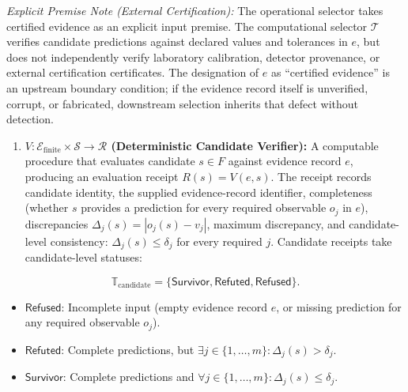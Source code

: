 \documentclass[
  10pt,
]{article}
\providecommand{\tightlist}{%
  \setlength{\itemsep}{0pt}\setlength{\parskip}{0pt}}
\providecommand{\tightlist}{%
  \setlength{\itemsep}{0pt}\setlength{\parskip}{0pt}}
\begin{document}
\emph{Explicit Premise Note (External Certification):} The operational selector takes certified evidence as an explicit input premise. The computational selector \hypertarget{math-E0142-0188}{}{\(\mathcal{T}\)} verifies candidate predictions against declared values and tolerances in \hypertarget{math-E0006-0189}{}{\(e\)}, but does not independently verify laboratory calibration, detector provenance, or external certification certificates. The designation of \hypertarget{math-E0006-0190}{}{\(e\)} as ``certified evidence'' is an upstream boundary condition; if the evidence record itself is unverified, corrupt, or fabricated, downstream selection inherits that defect without detection.

\begin{enumerate}
\def\labelenumi{\arabic{enumi}.}
\setcounter{enumi}{2}
\tightlist
\item
  \textbf{\hypertarget{math-E0143-0191}{}{\(V: \mathcal{E}_{\text{finite}} \times \mathcal{S} \to \mathcal{R}\)} (Deterministic Candidate Verifier):} A computable procedure that evaluates candidate \hypertarget{math-E0144-0192}{}{\(s \in F\)} against evidence record \hypertarget{math-E0006-0193}{}{\(e\)}, producing an evaluation receipt \hypertarget{math-E0145-0194}{}{\(R(s) = V(e, s)\)}. The receipt records candidate identity, the supplied evidence-record identifier, completeness (whether \hypertarget{math-E0146-0195}{}{\(s\)} provides a prediction for every required observable \hypertarget{math-E0139-0196}{}{\(o_j\)} in \hypertarget{math-E0006-0197}{}{\(e\)}), discrepancies \hypertarget{math-E0147-0198}{}{\(\Delta_j(s) = |o_j(s) - v_j|\)}, maximum discrepancy, and candidate-level consistency: \hypertarget{math-E0148-0199}{}{\(\Delta_j(s) \le \delta_j\)} for every required \hypertarget{math-E0149-0200}{}{\(j\)}. Candidate receipts take candidate-level statuses:
\end{enumerate}

\hypertarget{math-E0150-0201}{}{\[\mathbb{T}_{\text{candidate}} = \{\mathsf{Survivor}, \mathsf{Refuted}, \mathsf{Refused}\}.\]}

\begin{itemize}
\item
  \hypertarget{math-E0151-0202}{}{\(\mathsf{Refused}\)}: Incomplete input (empty evidence record \hypertarget{math-E0006-0203}{}{\(e\)}, or missing prediction for any required observable \hypertarget{math-E0139-0204}{}{\(o_j\)}).
\item
  \hypertarget{math-E0152-0205}{}{\(\mathsf{Refuted}\)}: Complete predictions, but \hypertarget{math-E0153-0206}{}{\(\exists j \in \{1, \ldots, m\}: \Delta_j(s) > \delta_j\)}.
\item
  \hypertarget{math-E0154-0207}{}{\(\mathsf{Survivor}\)}: Complete predictions and \hypertarget{math-E0155-0208}{}{\(\forall j \in \{1, \ldots, m\}: \Delta_j(s) \le \delta_j\)}.
\end{itemize}
\end{document}
